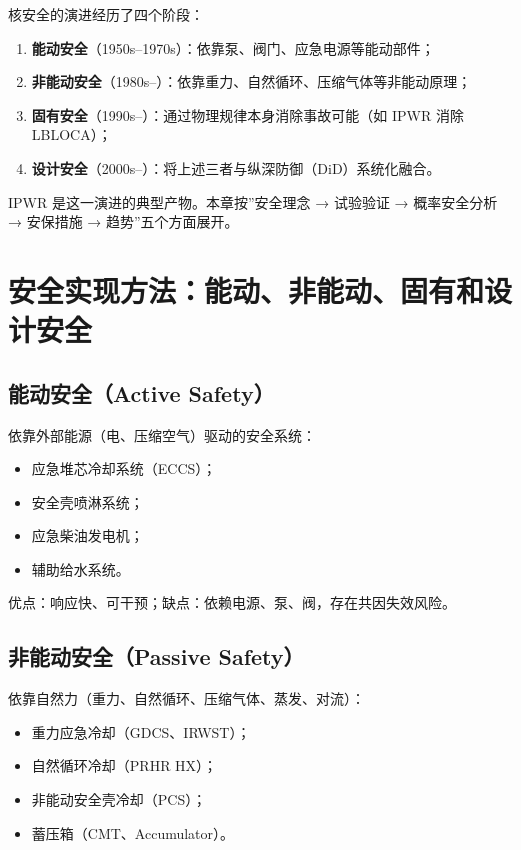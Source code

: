 \documentclass[
  UTF8,
  scheme=plain,
  fontsize=10pt,
  openany
]{ctexbook}
\begin{document}
核安全的演进经历了四个阶段：

\begin{enumerate}
\def\labelenumi{\arabic{enumi}.}
\tightlist
\item
  \textbf{能动安全}（1950s--1970s）：依靠泵、阀门、应急电源等能动部件；
\item
  \textbf{非能动安全}（1980s--）：依靠重力、自然循环、压缩气体等非能动原理；
\item
  \textbf{固有安全}（1990s--）：通过物理规律本身消除事故可能（如 IPWR
  消除 LBLOCA）；
\item
  \textbf{设计安全}（2000s--）：将上述三者与纵深防御（DiD）系统化融合。
\end{enumerate}

IPWR 是这一演进的典型产物。本章按''安全理念 → 试验验证 → 概率安全分析 →
安保措施 → 趋势''五个方面展开。

\section{安全实现方法：能动、非能动、固有和设计安全}\label{ux5b89ux5168ux5b9eux73b0ux65b9ux6cd5ux80fdux52a8ux975eux80fdux52a8ux56faux6709ux548cux8bbeux8ba1ux5b89ux5168}

\subsection{能动安全（Active
Safety）}\label{ux80fdux52a8ux5b89ux5168active-safety}

依靠外部能源（电、压缩空气）驱动的安全系统：

\begin{itemize}
\tightlist
\item
  应急堆芯冷却系统（ECCS）；
\item
  安全壳喷淋系统；
\item
  应急柴油发电机；
\item
  辅助给水系统。
\end{itemize}

优点：响应快、可干预；缺点：依赖电源、泵、阀，存在共因失效风险。

\subsection{非能动安全（Passive
Safety）}\label{ux975eux80fdux52a8ux5b89ux5168passive-safety}

依靠自然力（重力、自然循环、压缩气体、蒸发、对流）：

\begin{itemize}
\tightlist
\item
  重力应急冷却（GDCS、IRWST）；
\item
  自然循环冷却（PRHR HX）；
\item
  非能动安全壳冷却（PCS）；
\item
  蓄压箱（CMT、Accumulator）。
\end{itemize}
\end{document}

